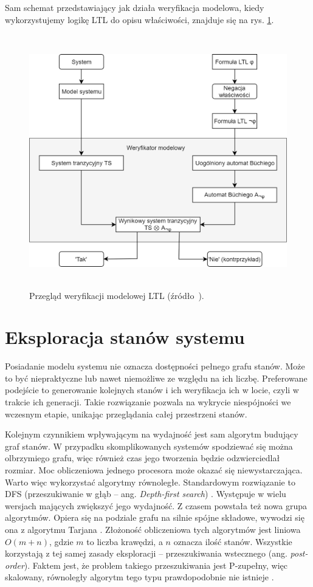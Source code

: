 Sam schemat przedstawiający jak działa weryfikacja modelowa, kiedy wykorzystujemy logikę LTL do opisu właściwości, znajduje się na rys. \ref{fig:ltl_model_checking}.

\begin{figure}[h]
    \centering
    \includegraphics[height=11cm,keepaspectratio]{img/ltl_model_checking_overview.png}
    \caption{Przegląd weryfikacji modelowej LTL (źródło~\cite{Bai08}).}
    \label{fig:ltl_model_checking}
\end{figure}


\section{Eksploracja stanów systemu}

Posiadanie modelu systemu nie oznacza dostępności pełnego grafu stanów.
Może to być niepraktyczne lub nawet niemożliwe ze względu na ich liczbę.
Preferowane podejście to generowanie kolejnych stanów i ich weryfikacja ich w locie, czyli w trakcie ich generacji.
Takie rozwiązanie pozwala na wykrycie niespójności we wczesnym etapie, unikając przeglądania całej przestrzeni stanów.

Kolejnym czynnikiem wpływającym na wydajność jest sam algorytm budujący graf stanów.
W przypadku skomplikowanych systemów spodziewać się można olbrzymiego grafu, więc również czas jego tworzenia będzie odzwierciedlał rozmiar.
Moc obliczeniowa jednego procesora może okazać się niewystarczająca.
Warto więc wykorzystać algorytmy równoległe.
Standardowym rozwiązanie to DFS (przeszukiwanie w głąb -- ang. \textit{Depth-first search}) \cite{God94}\cite{Hol99}.
Występuje w wielu wersjach mających zwiększyć jego wydajność.
Z czasem powstała też nowa grupa algorytmów.
Opiera się na podziale grafu na silnie spójne składowe, wywodzi się ona z algorytmu Tarjana \cite{Jac05}.
Złożoność obliczeniowa tych algorytmów jest liniowa $O(m + n)$, gdzie $m$ to liczba krawędzi, a $n$ oznacza ilość stanów.
Wszystkie korzystają z tej samej zasady eksploracji -- przeszukiwania wstecznego (ang. \textit{post-order}).
Faktem jest, że problem takiego przeszukiwania jest P-zupełny, więc skalowany, równoległy algorytm tego typu prawdopodobnie nie istnieje \cite{Reif85}.

